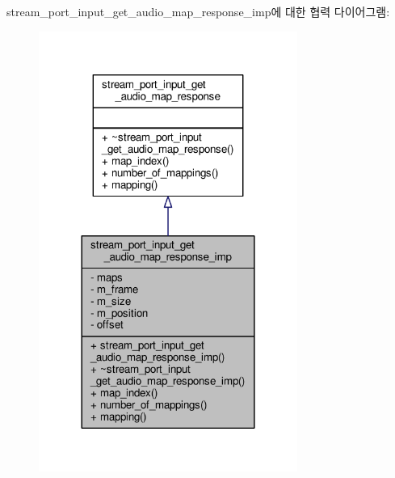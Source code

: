 stream\+\_\+port\+\_\+input\+\_\+get\+\_\+audio\+\_\+map\+\_\+response\+\_\+imp에 대한 협력 다이어그램\+:
\nopagebreak
\begin{figure}[H]
\begin{center}
\leavevmode
\includegraphics[width=240pt]{classavdecc__lib_1_1stream__port__input__get__audio__map__response__imp__coll__graph}
\end{center}
\end{figure}
